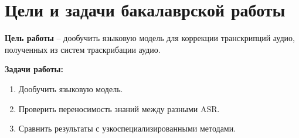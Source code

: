 \section{Цели и задачи бакалаврской работы}

\textbf{Цель работы} -- дообучить языковую модель для коррекции транскрипций аудио, полученных из систем траскрибации аудио.

\textbf{Задачи работы:}
\begin{enumerate}
  \item Дообучить языковую модель.
  \item Проверить переносимость знаний между разными ASR.
  \item Сравнить результаты с узкоспециализированными методами.
\end{enumerate}
